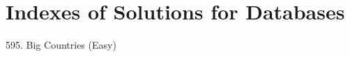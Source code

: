 \tocless\section{Indexes of Solutions for Databases}
\label{sec:db_ind}

\begin{flushleft}
595. Big Countries (Easy)\hfill\pageref{db:595}
\end{flushleft}

\newpage
